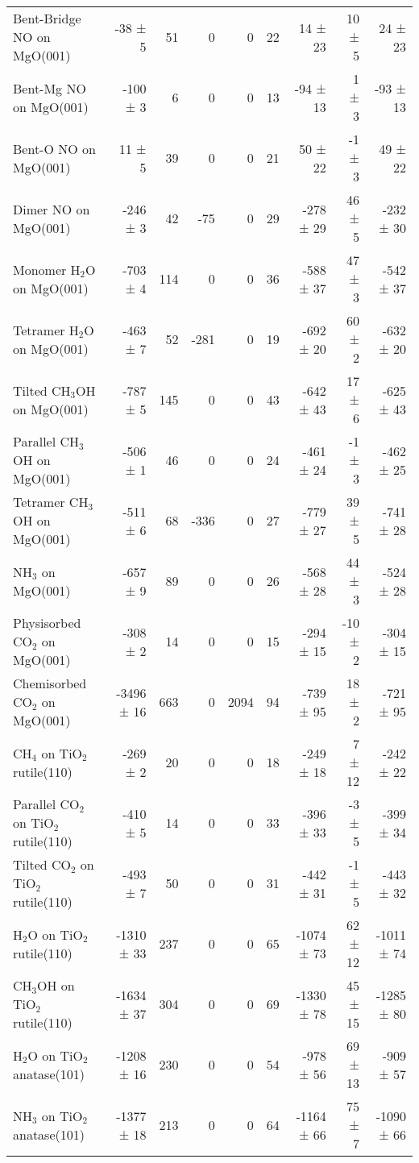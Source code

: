 \begin{table}
\begin{adjustbox}{center,max width=0.9\textwidth}
\begin{tabular}{lrrrrrrrr}
Bent-Bridge NO on MgO(001) & -38 ± 5 & 51 & 0 & 0 & 22 & 14 ± 23 & 10 ± 5 & 24 ± 23 \\
Bent-Mg NO on MgO(001) & -100 ± 3 & 6 & 0 & 0 & 13 & -94 ± 13 & 1 ± 3 & -93 ± 13 \\
Bent-O NO on MgO(001) & 11 ± 5 & 39 & 0 & 0 & 21 & 50 ± 22 & -1 ± 3 & 49 ± 22 \\
Dimer NO on MgO(001) & -246 ± 3 & 42 & -75 & 0 & 29 & -278 ± 29 & 46 ± 5 & -232 ± 30 \\
Monomer H$_2$O on MgO(001) & -703 ± 4 & 114 & 0 & 0 & 36 & -588 ± 37 & 47 ± 3 & -542 ± 37 \\
Tetramer H$_2$O on MgO(001) & -463 ± 7 & 52 & -281 & 0 & 19 & -692 ± 20 & 60 ± 2 & -632 ± 20 \\
Tilted CH$_3$OH on MgO(001) & -787 ± 5 & 145 & 0 & 0 & 43 & -642 ± 43 & 17 ± 6 & -625 ± 43 \\
Parallel CH$_3$OH on MgO(001) & -506 ± 1 & 46 & 0 & 0 & 24 & -461 ± 24 & -1 ± 3 & -462 ± 25 \\
Tetramer CH$_3$OH on MgO(001) & -511 ± 6 & 68 & -336 & 0 & 27 & -779 ± 27 & 39 ± 5 & -741 ± 28 \\
NH$_3$ on MgO(001) & -657 ± 9 & 89 & 0 & 0 & 26 & -568 ± 28 & 44 ± 3 & -524 ± 28 \\
Physisorbed CO$_2$ on MgO(001) & -308 ± 2 & 14 & 0 & 0 & 15 & -294 ± 15 & -10 ± 2 & -304 ± 15 \\
Chemisorbed CO$_2$ on MgO(001) & -3496 ± 16 & 663 & 0 & 2094 & 94 & -739 ± 95 & 18 ± 2 & -721 ± 95 \\
CH$_4$ on TiO$_2$ rutile(110) & -269 ± 2 & 20 & 0 & 0 & 18 & -249 ± 18 & 7 ± 12 & -242 ± 22 \\
Parallel CO$_2$ on TiO$_2$ rutile(110) & -410 ± 5 & 14 & 0 & 0 & 33 & -396 ± 33 & -3 ± 5 & -399 ± 34 \\
Tilted CO$_2$ on TiO$_2$ rutile(110) & -493 ± 7 & 50 & 0 & 0 & 31 & -442 ± 31 & -1 ± 5 & -443 ± 32 \\
H$_2$O on TiO$_2$ rutile(110) & -1310 ± 33 & 237 & 0 & 0 & 65 & -1074 ± 73 & 62 ± 12 & -1011 ± 74 \\
CH$_3$OH on TiO$_2$ rutile(110) & -1634 ± 37 & 304 & 0 & 0 & 69 & -1330 ± 78 & 45 ± 15 & -1285 ± 80 \\
H$_2$O on TiO$_2$ anatase(101) & -1208 ± 16 & 230 & 0 & 0 & 54 & -978 ± 56 & 69 ± 13 & -909 ± 57 \\
NH$_3$ on TiO$_2$ anatase(101) & -1377 ± 18 & 213 & 0 & 0 & 64 & -1164 ± 66 & 75 ± 7 & -1090 ± 66 \\
\bottomrule
\end{tabular}
\end{adjustbox}
\end{table}